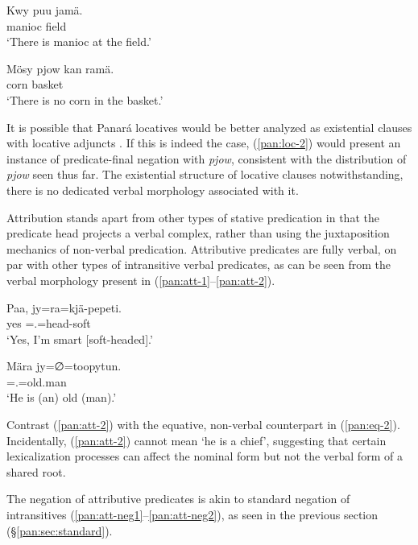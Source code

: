 \documentclass[output=paper,colorlinks,citecolor=brown,draft]{langscibook}
\begin{document}
\ea\label{pan:loc-1}
    \gll Kwy puu jamä. \\
     manioc field \Ade{} \\
    \glt `There is manioc at the field.' \\
\z

\ea\label{pan:loc-2}
    \gll Mösy pjow kan ramä. \\
     corn \Neg{} basket \Ine{} \\
    \glt `There is no corn in the basket.' \\
\z

It is possible that Panará locatives would be better analyzed as existential clauses with locative adjuncts \citep[8--10]{OverallEtAl2018}. If this is indeed the case, (\ref{pan:loc-2}) would present an instance of predicate-final negation with \textit{pjow}, consistent with the distribution of \textit{pjow} seen thus far. The existential structure of locative clauses notwithstanding, there is no dedicated verbal morphology associated with it.

Attribution stands apart from other types of stative predication in that the predicate head projects a verbal complex, rather than using the juxtaposition mechanics of non-verbal predication. Attributive predicates are fully verbal, on par with other types of intransitive verbal predicates, as can be seen from the verbal morphology present in (\ref{pan:att-1}--\ref{pan:att-2}).

\ea\label{pan:att-1}
    \gll Paa, jy=ra=kjä-pepeti. \\
    yes \Intr{}=\Fsg.\Abs{}=head-soft \\
    \glt `Yes, I'm smart [soft-headed].' \\
\z

\ea\label{pan:att-2}
    \gll Mära jy=∅=toopytun. \\
    \Tsg{} \Intr{}=\Tsg.\Abs{}=old.man \\
    \glt `He is (an) old (man).' \\
\z

Contrast (\ref{pan:att-2}) with the equative, non-verbal counterpart in (\ref{pan:eq-2}). Incidentally, (\ref{pan:att-2}) cannot mean `he is a chief', suggesting that certain lexicalization processes can affect the nominal form but not the verbal form of a shared root.

The negation of attributive predicates is akin to standard negation of intransitives (\ref{pan:att-neg1}--\ref{pan:att-neg2}), as seen in the previous section (\S\ref{pan:sec:standard}).
\end{document}
